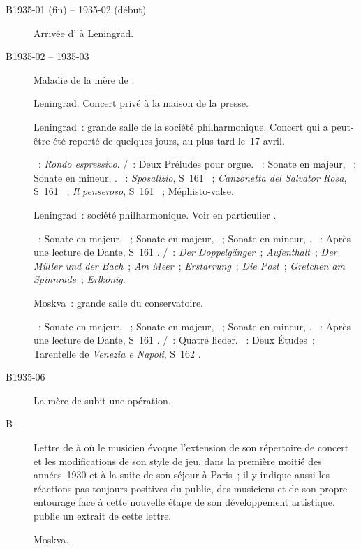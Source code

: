 \begin{description}
 \item[B1935-01 (fin) -- 1935-02 (début)]
 Arrivée d'\ESofronitskaya{} à Leningrad.
 \item[B1935-02 -- 1935-03]
 Maladie de la mère de \VSofronitsky{}.
 \item[]
 Leningrad.
 Concert privé à la maison de la presse.
 \item[]
 Leningrad~: grande salle de la société philharmonique.
 Concert qui a peut-être été reporté de quelques jours, au plus tard le~17
 avril.

 \textsc{\CBach{}}~: \emph{Rondo espressivo}.
 \textsc{\JBach{}/\Busoni{}}~: Deux Préludes pour orgue.
 \textsc{\Beethoven{}}~: Sonate en \kD majeur,  ~; Sonate
 en \kC mineur, .
 \textsc{\Liszt{}}~: \emph{Sposalizio}, S~161 ~; \emph{Canzonetta
 del Salvator Rosa}, S~161 ~; \emph{Il penseroso}, S~161
 ~; Méphisto-valse.
 \item[]
 Leningrad~: société philharmonique.
 Voir en particulier \citet[p.~427]{Milshteyn82a}.

 \textsc{\Beethoven{}}~: Sonate en \kD majeur, ~; Sonate en \kF
 \Sharp majeur, ~; Sonate en \kC \Sharp mineur, 
 .
 \textsc{\Liszt{}}~: Après une lecture de Dante, S~161 .
 \textsc{\Schubert{}/\Liszt{}}~: \emph{Der Doppelgänger}~;
 \emph{Aufenthalt}~; \emph{Der Müller und der Bach}~; \emph{Am Meer}~;
 \emph{Erstarrung}~; \emph{Die Post}~; \emph{Gretchen am Spinnrade}~;
 \emph{Erlkönig}.
 \item[]
 Moskva~: grande salle du conservatoire.

 \textsc{\Beethoven{}}~: Sonate en \kD majeur, ~; Sonate en \kF
 \Sharp majeur, ~; Sonate en \kC \Sharp mineur, 
 .
 \textsc{\Liszt{}}~: Après une lecture de Dante, S~161 .
 \textsc{\Schubert{}/\Liszt{}}~: Quatre lieder.
 \textsc{\Liszt{}}~: Deux Études~; Tarentelle de \emph{Venezia e Napoli},
 S~162 .
 \item[B1935-06]
 La mère de \VSofronitsky{} subit une opération.
 \item[B]
 Lettre de \VSofronitsky{} à \AVizel{} où le musicien évoque l'extension de
 son répertoire de concert et les modifications de son style de jeu, dans la
 première moitié des années~1930 et à la suite de son séjour à Paris~; il y
 indique aussi les réactions pas toujours positives du public, des musiciens
 et de son propre entourage face à cette nouvelle étape de son développement
 artistique.
 \citet[p.~156]{Nekrasova08} publie un extrait de cette lettre.
 \item[]
 Moskva.


\end{description}
